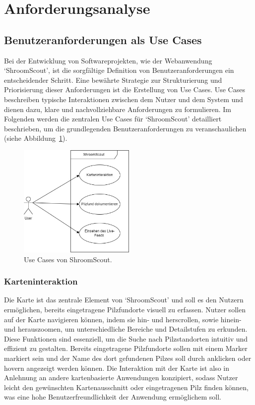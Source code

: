 \section{Anforderungsanalyse}

\subsection{Benutzeranforderungen als Use Cases}

Bei der Entwicklung von Softwareprojekten, wie der Webanwendung `ShroomScout', ist die sorgfältige Definition von
Benutzeranforderungen ein entscheidender Schritt. Eine bewährte Strategie zur Strukturierung und Priorisierung dieser
Anforderungen ist die Erstellung von Use Cases. Use Cases beschreiben typische Interaktionen zwischen dem Nutzer und
dem System und dienen dazu, klare und nachvollziehbare Anforderungen zu formulieren. Im Folgenden werden die zentralen
Use Cases für `ShroomScout' detailliert beschrieben, um die grundlegenden Benutzeranforderungen zu veranschaulichen
(siehe Abbildung~\ref{fig:UseCase_Diagramm}).

\begin{figure}[ht]
	\centering
	\includegraphics[width=0.5\textwidth]{abbildungen/UseCaseDiagrammDrawio.jpg}
	\caption{Use Cases von ShroomScout.}
	\label{fig:UseCase_Diagramm}
\end{figure}

\subsubsection{Karteninteraktion}

Die Karte ist das zentrale Element von `ShroomScout' und soll es den Nutzern ermöglichen, bereits eingetragene Pilzfundorte
visuell zu erfassen. Nutzer sollen auf der Karte navigieren können, indem sie hin- und herscrollen, sowie hinein- und herauszoomen,
um unterschiedliche Bereiche und Detailstufen zu erkunden. Diese Funktionen sind essenziell, um die Suche nach Pilzstandorten
intuitiv und effizient zu gestalten. Bereits eingetragene Pilzfundorte sollen mit einem Marker markiert sein und der Name des
dort gefundenen Pilzes soll durch anklicken oder hovern angezeigt werden können. Die Interaktion mit der Karte ist also in
Anlehnung an andere kartenbasierte Anwendungen konzipiert, sodass Nutzer leicht den gewünschten Kartenausschnitt oder
eingetragenen Pilz finden können, was eine hohe Benutzerfreundlichkeit der Anwendung ermöglichem soll.

